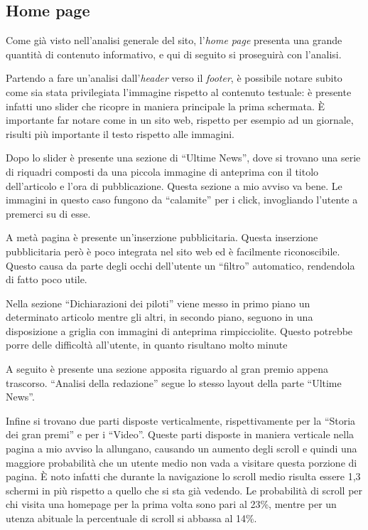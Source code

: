 \subsection{Home page}
Come già visto nell'analisi generale del sito, l'\textit{home page} presenta
una grande quantità di contenuto informativo, e qui di seguito si proseguirà con
l'analisi.

Partendo a fare un'analisi dall'\textit{header} verso il \textit{footer}, è 
possibile notare subito come sia stata privilegiata l'immagine rispetto al
contenuto testuale: è presente infatti uno slider che ricopre in maniera 
principale la prima schermata. È importante far notare come in un sito web,
rispetto per esempio ad un giornale, risulti più importante il testo rispetto
alle immagini.

Dopo lo slider è presente una sezione di ``Ultime News'', dove si trovano
una serie di riquadri composti da una piccola immagine di anteprima con il
titolo dell'articolo e l'ora di pubblicazione. Questa sezione a mio avviso va
bene. Le immagini in questo caso fungono da ``calamite'' per i click,
invogliando l'utente a premerci su di esse.

A metà pagina è presente un'inserzione pubblicitaria. Questa inserzione
pubblicitaria però è poco integrata nel sito web ed è facilmente riconoscibile.
Questo causa da parte degli occhi dell'utente un ``filtro'' automatico,
rendendola di fatto poco utile.

Nella sezione ``Dichiarazioni dei piloti'' viene messo in primo piano un
determinato articolo mentre gli altri, in secondo piano, seguono in una
disposizione a griglia con immagini di anteprima rimpicciolite. Questo potrebbe
porre delle difficoltà all'utente, in quanto risultano molto minute

A seguito è presente una sezione apposita riguardo al gran premio appena
trascorso. ``Analisi della redazione'' segue lo stesso layout della parte
``Ultime News''.

Infine si trovano due parti disposte verticalmente, rispettivamente per la
``Storia dei gran premi'' e per i ``Video''. Queste parti disposte in maniera
verticale nella pagina a mio avviso la allungano, causando un aumento degli
scroll e quindi una maggiore probabilità che un utente medio non vada a visitare
questa porzione di pagina. È noto infatti che durante la navigazione lo scroll
medio risulta essere 1,3 schermi in più rispetto a quello che si sta già
vedendo. Le probabilità di scroll per chi visita una homepage per la prima
volta sono pari al 23\%, mentre per un utenza abituale la percentuale di scroll
si abbassa al 14\%.

